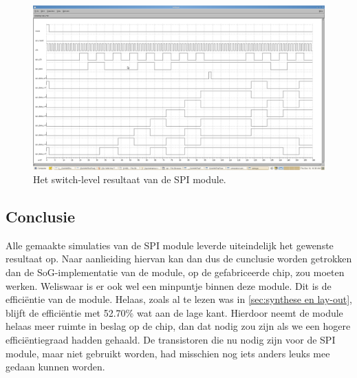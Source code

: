 \documentclass{scrartcl} %
\begin{document}
\begin{figure}[H]
	\centering
	\includegraphics[width=\textwidth]{resource/switchlevelSPI.png}
	\caption{Het switch-level resultaat van de SPI module.}
	\label{fig:switchlevelSPI}
\end{figure}

\subsection{Conclusie}
Alle gemaakte simulaties van de SPI module leverde uiteindelijk het gewenste resultaat op. Naar aanlieiding hiervan kan dan dus de cunclusie worden getrokken dan de SoG-implementatie van de module, op de gefabriceerde chip, zou moeten werken. Weliswaar is er ook wel een minpuntje binnen deze module. Dit is de effici\"entie van de module. Helaas, zoals al te lezen was in \ref{sec:synthese en lay-out}, blijft de effici\"entie met 52.70\% wat aan de lage kant. Hierdoor neemt de module helaas meer ruimte in beslag op de chip, dan dat nodig zou zijn als we een hogere effici\"entiegraad hadden gehaald. De transistoren die nu nodig zijn voor de SPI module, maar niet gebruikt worden, had misschien nog iets anders leuks mee gedaan kunnen worden. 
\end{document}
